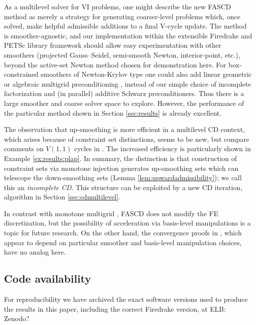 \documentclass[letterpaper,final,12pt,reqno]{amsart}
\theoremstyle{cstyle}
\theoremstyle{cstyle*}
\theoremstyle{dstyle}
\numberwithin{equation}{section}
\numberwithin{figure}{section}
\numberwithin{table}{section}
\numberwithin{theorem}{section}
\begin{document}
As a multilevel solver for VI problems, one might describe the new FASCD method as merely a strategy for generating coarser-level problems which, once solved, make helpful admissible additions to a final V-cycle update.  The method is smoother-agnostic, and our implementation within the extensible Firedrake \cite{Rathgeberetal2016} and PETSc \cite{Balayetal2023} library framework should allow easy experimentation with other smoothers (projected Gauss--Seidel, semi-smooth Newton, interior-point, etc.), beyond the active-set Newton method \cite{BensonMunson2006} chosen for demonstration here.  For box-constrained smoothers of Newton-Krylov type one could also add linear geometric or algebraic multigrid preconditioning \cite{Trottenbergetal2001}, instead of our simple choice of incomplete factorization and (in parallel) additive Schwarz preconditioners.  Thus there is a large smoother and coarse solver space to explore.  However, the performance of the particular method shown in Section \ref{sec:results} is already excellent.

The observation that up-smoothing is more efficient in a multilevel CD context, which arises because of constraint set distinctions, seems to be new, but compare comments on $V(1,1)$ cycles in \cite{GraeserKornhuber2009,Tai2003}.  The increased efficiency is particularly shown in Example \ref{ex:results:plap}.  In summary, the distinction is that construction of constraint sets via monotone injection generates up-smoothing sets which can telescope the down-smoothing sets (Lemma \ref{lem:upwardadmissibility}); we call this an \emph{incomplete CD}.  This structure can be exploited by a new CD iteration, algorithm  in Section \ref{sec:cdmultilevel}.

In contrast with monotone multigrid \cite{Kornhuber1994}, FASCD does not modify the FE discretization, but the possibility of acceleration via basis-level manipulations is a topic for future research.  On the other hand,  the convergence proofs in \cite{GraeserKornhuber2009,Kornhuber1994}, which appear to depend on particular smoother and basis-level manipulation choices, have no analog here.



\subsection*{Code availability} \label{sec:code}  For reproducibility we have archived the exact software versions used to produce the results in this paper, including the correct Firedrake version, at {\color{blue} ELB: Zenodo?}
\end{document}
